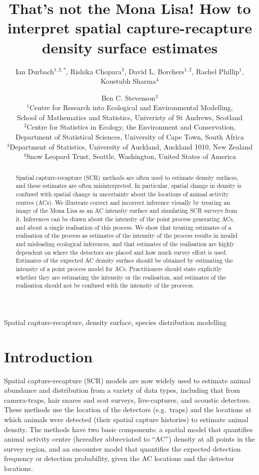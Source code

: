 \documentclass[useAMS,usenatbib,referee]{biom}
\title[How to interpret SCR density surface estimates]{That's not the Mona Lisa! How to interpret spatial capture-recapture density surface estimates}
\author{Ian Durbach$^{1,2,*}$, Rishika Chopara$^{3}$, David L. Borchers$^{1,2}$, Rachel Phillip$^{1}$, Koustubh Sharma$^{4}$ \and Ben C. Stevenson$^{3}$ \\
$^{1}$Centre for Research into Ecological and Environmental Modelling, \\ School of Mathematics and Statistics, Univeristy of St Andrews, Scotland \\
$^{2}$Centre for Statistics in Ecology, the Environment and Conservation, \\ Department of Statistical Sciences, University of Cape Town, South Africa \\
$^{3}$Department of Statistics, University of Auckland, Auckland 1010, New Zealand \\
$^{4}$Snow Leopard Trust, Seattle, Washington, United States of America \\
\email{indurbach@gmail.com}}
\begin{document}
\begin{abstract}
Spatial capture-recapture (SCR) methods are often used to estimate density surfaces, and these estimates are often misinterpreted. In particular, spatial change in density is confused with spatial change in uncertainty about the locations of animal activity centres (ACs). We illustrate correct and incorrect inference visually by treating an image of the Mona Lisa as an AC intensity surface and simulating SCR surveys from it. Inferences can be drawn about the intensity of the point process generating ACs, and about a single realisation of this process. We show that treating estimates of a realisation of the process as estimates of the intensity of the process results in invalid and misleading ecological inferences, and that estimates of the realisation are highly dependent on where the detectors are placed and how much survey effort is used. Estimates of the expected AC density surface should be obtained by estimating the intensity of a point process model for ACs. Practitioners should state explicitly whether they are estimating the intensity or the realisation, and estimates of the realisation should not be confused with the intensity of the procecss.
\end{abstract}

\begin{keywords}
Spatial capture-recapture, density surface, species distribution modelling
\end{keywords}

\maketitle 

\section{Introduction}

Spatial capture-recapture (SCR) models \citep*{Efford:04,Borchers+Efford:08, Royle+Young:08} are now widely used to estimate animal abundance and distribution from a variety of data types, including that from camera-traps, hair snares and scat surveys, live-captures, and acoustic detectors. These methods use the location of the detectors (e.g.\ traps) and the locations at which animals were detected (their spatial capture histories) to estimate animal density. The methods have two basic components: a spatial model that quantifies animal activity centre (hereafter abbreviated to ``AC'') density at all points in the survey region, and an encounter model that quantifies the expected detection frequency or detection probability, given the AC locations and the detector locations. 
\end{document}
